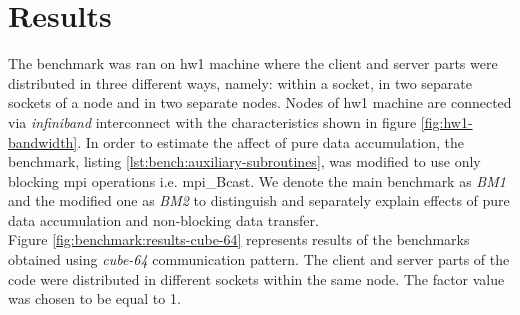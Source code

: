 \section{Results}
\label{sec:accumulator-results}


The benchmark was ran on \gls{hw1} machine where the client and server parts were distributed in three different ways, namely: within a socket, in two separate sockets of a node and in two separate nodes. Nodes of \gls{hw1} machine are connected via \textit{infiniband} interconnect with the characteristics shown in figure \ref{fig:hw1-bandwidth}. In order to estimate the affect of pure data accumulation, the benchmark, listing \ref{lst:bench:auxiliary-subroutines}, was modified to use only blocking \acrshort{mpi} operations i.e. \acrshort{mpi}\_Bcast. We denote the main benchmark as \textit{BM1} and the modified one as \textit{BM2} to distinguish and separately explain effects of pure data accumulation and non-blocking data transfer.\\


Figure \ref{fig:benchmark:results-cube-64} represents results of the benchmarks obtained using \textit{cube-64} communication pattern. The client and server parts of the code were distributed in different sockets within the same node. The factor value was chosen to be equal to 1.\\


